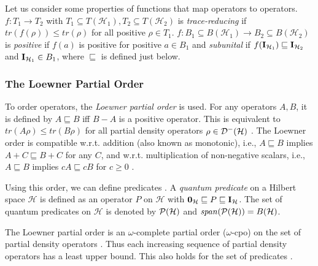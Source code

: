 \documentclass[a4paper,UKenglish,cleveref, autoref, thm-restate]{lipics-v2021}
\begin{document}
Let us consider some properties of functions that map operators to operators.
$f: T_1 \to T_2$ with $T_1 \subseteq T(\mathcal{H}_1), T_2 \subseteq T(\mathcal{H}_2)$ is \emph{trace-reducing} if $tr(f(\rho)) \leq tr(\rho)$ for all positive $\rho \in T_1$. $f: B_1 \subseteq B(\mathcal{H}_1) \to B_2 \subseteq B(\mathcal{H}_2) $ is \emph{positive} if $f(a) $ is positive for positive $a \in B_1$ and \emph{subunital} if $f(\textbf{I}_{\mathcal{H}_1}) \sqsubseteq \textbf{I}_{\mathcal{H}_2}$ and $\textbf{I}_{\mathcal{H}_1} \in B_1$, where $\sqsubseteq$ is defined just below.

\subsubsection{The Loewner Partial Order}
To order operators, the \textit{Loewner partial order} is used. For any operators $A,B$, it is defined by $A\sqsubseteq B$ iff $B-A$ is a positive operator. This is equivalent to $tr(A\rho)\leq tr(B \rho)$ for all partial density operators $\rho \in \mathcal{D}^- (\mathcal{H})$ \cite{floydHoareLogic}.
The Loewner order is compatible w.r.t. addition (also known as monotonic), i.e., $A \sqsubseteq B$ implies $A+C \sqsubseteq B+C$ for any $C$, and w.r.t. multiplication of non-negative scalars, i.e., $A\sqsubseteq B$ implies $c A \sqsubseteq c B$ for $c \geq 0 $ \cite{boyd2004convex}.

Using this order, we can define predicates \cite{DHondtWeakestPreconditions}. A \emph{quantum predicate} on a Hilbert space $\mathcal{H}$ is defined as an operator $P$ on $\mathcal{H}$ with $\mathbf{0}_{\mathcal{H}}\sqsubseteq P \sqsubseteq \textbf{I}_{\mathcal{H}}$. The set of quantum predicates on $\mathcal{H}$ is denoted by $\mathcal{P}(\mathcal{H})$ and $\mathit{span}(\mathcal{P}(\mathcal{H})) = B(\mathcal{H})$.

The Loewner partial order is an $\omega$-complete partial order ($\omega$-cpo) on the set of partial density operators \cite{YingPredicateTranserformerSemantics}. Thus each increasing sequence of partial density operators has a least upper bound.
This also holds for the set of predicates \cite{DHondtWeakestPreconditions}.
\end{document}
